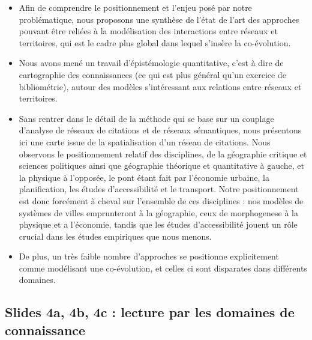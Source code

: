 \documentclass[11pt]{article}
\begin{document}
\begin{itemize}
	\item Afin de comprendre le positionnement et l'enjeu posé par notre problématique, nous proposons une synthèse de l'état de l'art des approches pouvant être reliées à la modélisation des interactions entre réseaux et territoires, qui est le cadre plus global dans lequel s'insère la co-évolution.
	\item Nous avons mené un travail d'épistémologie quantitative, c'est à dire de cartographie des connaissances (ce qui est plus général qu'un exercice de bibliométrie), autour des modèles s'intéressant aux relations entre réseaux et territoires.
	\item Sans rentrer dans le détail de la méthode qui se base sur un couplage d'analyse de réseaux de citations et de réseaux sémantiques, nous présentons ici une carte issue de la spatialisation d'un réseau de citations. Nous observons le positionnement relatif des disciplines, de la géographie critique et sciences politiques ainsi que géographie théorique et quantitative à gauche, et la physique à l'opposée, le pont étant fait par l'économie urbaine, la planification, les études d'accessibilité et le transport. Notre positionnement est donc forcément à cheval sur l'ensemble de ces disciplines : nos modèles de systèmes de villes emprunteront à la géographie, ceux de morphogenese à la physique et a l'économie, tandis que les études d'accessibilité jouent un rôle crucial dans les études empiriques que nous menons.
	\item De plus, un très faible nombre d'approches se positionne explicitement comme modélisant une co-évolution, et celles ci sont disparates dans différents domaines.
\end{itemize}






\subsection*{Slides 4a, 4b, 4c : lecture par les domaines de connaissance}
\end{document}
